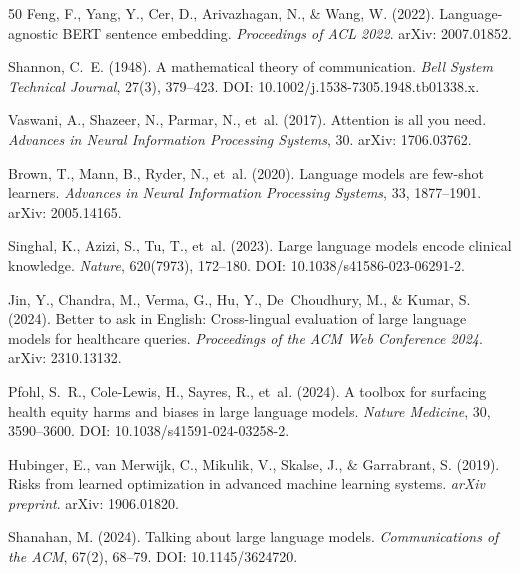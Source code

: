\documentclass[11pt,a4paper]{article}
\begin{document}
\begin{thebibliography}{50}
Feng, F., Yang, Y., Cer, D., Arivazhagan, N., \& Wang, W. (2022).
\newblock Language-agnostic {BERT} sentence embedding.
\newblock \emph{Proceedings of ACL 2022}.
\newblock arXiv: 2007.01852.

Shannon, C.~E. (1948).
\newblock A mathematical theory of communication.
\newblock \emph{Bell System Technical Journal}, 27(3), 379--423.
\newblock DOI: 10.1002/j.1538-7305.1948.tb01338.x.

Vaswani, A., Shazeer, N., Parmar, N., et~al. (2017).
\newblock Attention is all you need.
\newblock \emph{Advances in Neural Information Processing Systems}, 30.
\newblock arXiv: 1706.03762.

Brown, T., Mann, B., Ryder, N., et~al. (2020).
\newblock Language models are few-shot learners.
\newblock \emph{Advances in Neural Information Processing Systems}, 33, 1877--1901.
\newblock arXiv: 2005.14165.

Singhal, K., Azizi, S., Tu, T., et~al. (2023).
\newblock Large language models encode clinical knowledge.
\newblock \emph{Nature}, 620(7973), 172--180.
\newblock DOI: 10.1038/s41586-023-06291-2.

Jin, Y., Chandra, M., Verma, G., Hu, Y., De~Choudhury, M., \& Kumar, S. (2024).
\newblock Better to ask in {English}: Cross-lingual evaluation of large language models
for healthcare queries.
\newblock \emph{Proceedings of the ACM Web Conference 2024}.
\newblock arXiv: 2310.13132.

Pfohl, S.~R., Cole-Lewis, H., Sayres, R., et~al. (2024).
\newblock A toolbox for surfacing health equity harms and biases in large language models.
\newblock \emph{Nature Medicine}, 30, 3590--3600.
\newblock DOI: 10.1038/s41591-024-03258-2.

Hubinger, E., van Merwijk, C., Mikulik, V., Skalse, J., \& Garrabrant, S. (2019).
\newblock Risks from learned optimization in advanced machine learning systems.
\newblock \emph{arXiv preprint}.
\newblock arXiv: 1906.01820.

Shanahan, M. (2024).
\newblock Talking about large language models.
\newblock \emph{Communications of the ACM}, 67(2), 68--79.
\newblock DOI: 10.1145/3624720.


\end{thebibliography}
\end{document}
